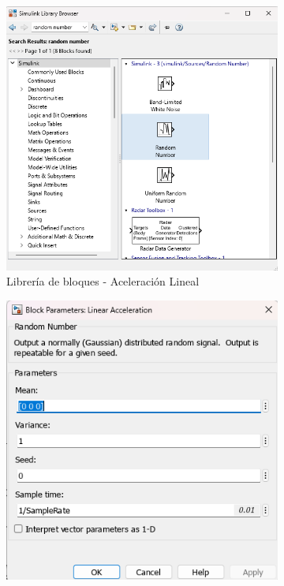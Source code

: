 \begin{figure}[htbp]
    \centering
    \begin{subfigure}[b]{0.45\textwidth}
        \centering
        \includegraphics[width=\textwidth]{fig/Capitulo5/Caso_de_estudio_IMU/Generador_de_archivos/libreria_de_bloques_aceleracion_lineal.png}
        \caption{Librería de bloques - Aceleración Lineal}
        \label{fig:lib_bloques_linear_acceleration}
    \end{subfigure}
    \hfill
    \begin{subfigure}[b]{0.45\textwidth}
        \centering
        \includegraphics[width=\textwidth]{fig/Capitulo5/Caso_de_estudio_IMU/Generador_de_archivos/configuracion_bloque_aceleracion_lineal.png}

\end{subfigure}
\end{figure}
